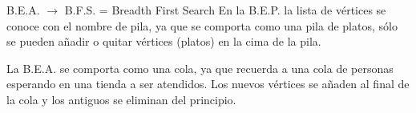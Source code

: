 \documentclass[twoside]{report}
\newcommand{\bs}[1]{\boldsymbol{#1}}
\begin{document}
\vspace{0.4cm}
        B.E.A. $\rightarrow$ B.F.S. = Breadth First Search
\vspace{0.4cm}
%
%
%
        En la B.E.P. la lista de vértices se conoce con el nombre de pila, ya que se comporta como una pila de platos,
        sólo se pueden añadir o quitar vértices (platos) en la cima de la pila.
\vspace{0.2cm}

        La B.E.A. se comporta como una cola, ya que recuerda a una cola de personas esperando en una tienda a ser atendidos. Los nuevos
        vértices se añaden al final de la cola y los antiguos se eliminan del principio.
\vspace{0.2cm}
\end{document}
